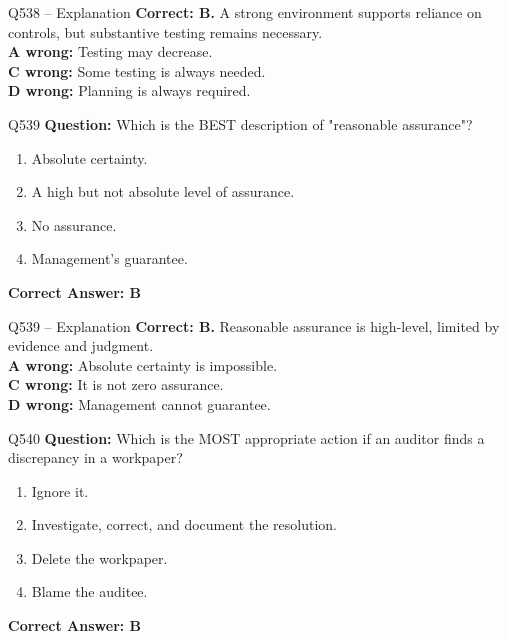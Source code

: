 \documentclass[aspectratio=169,10pt]{beamer}
\begin{document}
	\begin{frame}[t]{Q538 -- Explanation}
		\small
		\textbf{Correct: B.} A strong environment supports reliance on controls, but substantive testing remains necessary. \\[4pt]
		\textbf{A wrong:} Testing may decrease. \\[2pt]
		\textbf{C wrong:} Some testing is always needed. \\[2pt]
		\textbf{D wrong:} Planning is always required.
	\end{frame}
	
	\begin{frame}[t]{Q539}
		\small
		\textbf{Question:} Which is the BEST description of "reasonable assurance"?
		\begin{enumerate}[label=\Alph*.,itemsep=1pt,topsep=2pt]
			\item Absolute certainty.
			\item A high but not absolute level of assurance.
			\item No assurance.
			\item Management's guarantee.
		\end{enumerate}
		\vspace{4pt}
		\textbf{Correct Answer: B}
	\end{frame}
	
	\begin{frame}[t]{Q539 -- Explanation}
		\small
		\textbf{Correct: B.} Reasonable assurance is high-level, limited by evidence and judgment. \\[4pt]
		\textbf{A wrong:} Absolute certainty is impossible. \\[2pt]
		\textbf{C wrong:} It is not zero assurance. \\[2pt]
		\textbf{D wrong:} Management cannot guarantee.
	\end{frame}
	
	\begin{frame}[t]{Q540}
		\small
		\textbf{Question:} Which is the MOST appropriate action if an auditor finds a discrepancy in a workpaper?
		\begin{enumerate}[label=\Alph*.,itemsep=1pt,topsep=2pt]
			\item Ignore it.
			\item Investigate, correct, and document the resolution.
			\item Delete the workpaper.
			\item Blame the auditee.
		\end{enumerate}
		\vspace{4pt}
		\textbf{Correct Answer: B}
	\end{frame}
	
\end{document}
